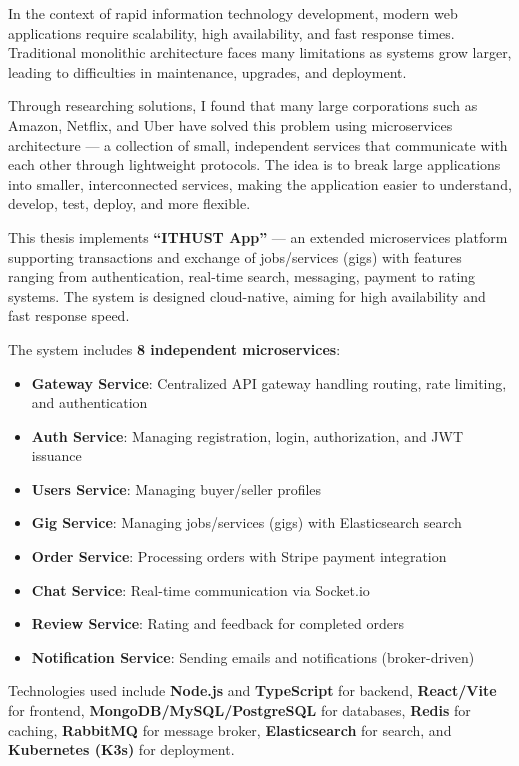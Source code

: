 \documentclass[12pt]{extreport}
\begin{document}
In the context of rapid information technology development, modern web applications require scalability, high availability, and fast response times. Traditional monolithic architecture faces many limitations as systems grow larger, leading to difficulties in maintenance, upgrades, and deployment.

Through researching solutions, I found that many large corporations such as Amazon, Netflix, and Uber have solved this problem using microservices architecture --- a collection of small, independent services that communicate with each other through lightweight protocols. The idea is to break large applications into smaller, interconnected services, making the application easier to understand, develop, test, deploy, and more flexible.

This thesis implements \textbf{``ITHUST App''} --- an extended microservices platform supporting transactions and exchange of jobs/services (gigs) with features ranging from authentication, real-time search, messaging, payment to rating systems. The system is designed cloud-native, aiming for high availability and fast response speed.

The system includes \textbf{8 independent microservices}:
\begin{itemize}
    \item \textbf{Gateway Service}: Centralized API gateway handling routing, rate limiting, and authentication
    \item \textbf{Auth Service}: Managing registration, login, authorization, and JWT issuance
    \item \textbf{Users Service}: Managing buyer/seller profiles
    \item \textbf{Gig Service}: Managing jobs/services (gigs) with Elasticsearch search
    \item \textbf{Order Service}: Processing orders with Stripe payment integration
    \item \textbf{Chat Service}: Real-time communication via Socket.io
    \item \textbf{Review Service}: Rating and feedback for completed orders
    \item \textbf{Notification Service}: Sending emails and notifications (broker-driven)
\end{itemize}

Technologies used include \textbf{Node.js} and \textbf{TypeScript} for backend, \textbf{React/Vite} for frontend, \textbf{MongoDB/MySQL/PostgreSQL} for databases, \textbf{Redis} for caching, \textbf{RabbitMQ} for message broker, \textbf{Elasticsearch} for search, and \textbf{Kubernetes (K3s)} for deployment.
\end{document}
